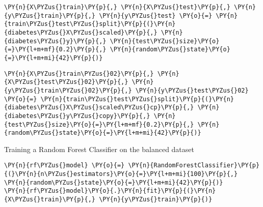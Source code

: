     \begin{tcolorbox}[breakable, size=fbox, boxrule=1pt, pad at break*=1mm,colback=cellbackground, colframe=cellborder]
\begin{Verbatim}[commandchars=\\\{\}]
\PY{n}{X\PYZus{}train}\PY{p}{,} \PY{n}{X\PYZus{}test}\PY{p}{,} \PY{n}{y\PYZus{}train}\PY{p}{,} \PY{n}{y\PYZus{}test} \PY{o}{=} \PY{n}{train\PYZus{}test\PYZus{}split}\PY{p}{(}\PY{n}{diabetes\PYZus{}X\PYZus{}scaled}\PY{p}{,} \PY{n}{diabetes\PYZus{}y}\PY{p}{,} \PY{n}{test\PYZus{}size}\PY{o}{=}\PY{l+m+mf}{0.2}\PY{p}{,} \PY{n}{random\PYZus{}state}\PY{o}{=}\PY{l+m+mi}{42}\PY{p}{)}
\end{Verbatim}
\end{tcolorbox}

    \begin{tcolorbox}[breakable, size=fbox, boxrule=1pt, pad at break*=1mm,colback=cellbackground, colframe=cellborder]
\begin{Verbatim}[commandchars=\\\{\}]
\PY{n}{X\PYZus{}train\PYZus{}02}\PY{p}{,} \PY{n}{X\PYZus{}test\PYZus{}02}\PY{p}{,} \PY{n}{y\PYZus{}train\PYZus{}02}\PY{p}{,} \PY{n}{y\PYZus{}test\PYZus{}02} \PY{o}{=} \PY{n}{train\PYZus{}test\PYZus{}split}\PY{p}{(}\PY{n}{diabetes\PYZus{}X\PYZus{}scaled\PYZus{}cp}\PY{p}{,} \PY{n}{diabetes\PYZus{}y\PYZus{}copy}\PY{p}{,} \PY{n}{test\PYZus{}size}\PY{o}{=}\PY{l+m+mf}{0.2}\PY{p}{,} \PY{n}{random\PYZus{}state}\PY{o}{=}\PY{l+m+mi}{42}\PY{p}{)}
\end{Verbatim}
\end{tcolorbox}

    Training a Random Forest Classifier on the balanced dataset

    \begin{tcolorbox}[breakable, size=fbox, boxrule=1pt, pad at break*=1mm,colback=cellbackground, colframe=cellborder]
\begin{Verbatim}[commandchars=\\\{\}]
\PY{n}{rf\PYZus{}model} \PY{o}{=} \PY{n}{RandomForestClassifier}\PY{p}{(}\PY{n}{n\PYZus{}estimators}\PY{o}{=}\PY{l+m+mi}{100}\PY{p}{,} \PY{n}{random\PYZus{}state}\PY{o}{=}\PY{l+m+mi}{42}\PY{p}{)}
\PY{n}{rf\PYZus{}model}\PY{o}{.}\PY{n}{fit}\PY{p}{(}\PY{n}{X\PYZus{}train}\PY{p}{,} \PY{n}{y\PYZus{}train}\PY{p}{)}
\end{Verbatim}
\end{tcolorbox}

